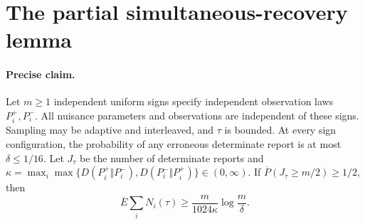 \section{The partial simultaneous-recovery lemma}
\label{app:partial}

\paragraph{Precise claim.}
Let $m\ge1$ independent uniform signs specify independent observation laws
$P_i^+,P_i^-$. All nuisance parameters and observations are independent of
these signs. Sampling may be adaptive and interleaved, and $\tau$ is bounded.
At every sign configuration, the probability of any erroneous determinate
report is at most $\delta\le1/16$. Let $J_\tau$ be the number of determinate
reports and
$\kappa=\max_i\max\{D(P_i^+\Vert P_i^-),D(P_i^-\Vert P_i^+)\}\in(0,\infty)$.
If $\overline P(J_\tau\ge m/2)\ge1/2$, then
\[
 \overline E\sum_iN_i(\tau)\ge\frac{m}{1024\kappa}\log\frac m\delta.
\]

